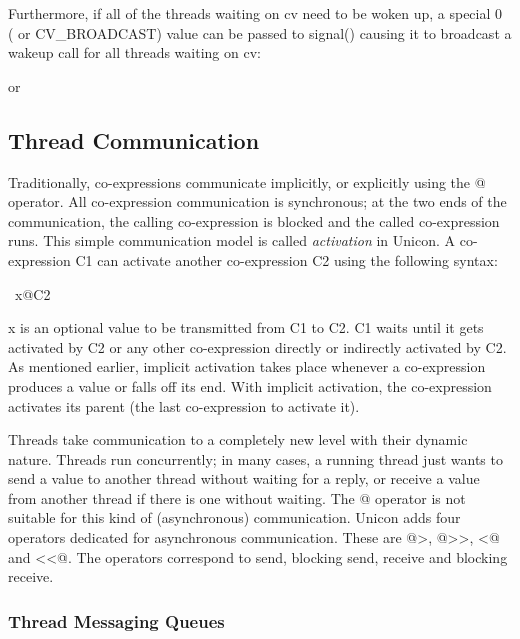 
Furthermore, if all of the threads waiting on
\textsf{cv} need to be woken up, a special
\textsf{0} ( or \textsf{CV\_BROADCAST})
value can be passed to \textsf{signal()} causing it to
broadcast a wakeup call for all threads waiting on
\textsf{cv}:


or



\subsection{Thread Communication}


Traditionally, co-expressions communicate implicitly, or explicitly
using the \textsf{@} operator. All co-expression
communication is synchronous; at the two ends of the communication, the
calling co-expression is blocked and the called co-expression runs.
This simple communication model is called \textit{activation} in
Unicon. A co-expression \textsf{C1} can activate another
co-expression \textsf{C2} using the following syntax:

\ x@C2

\textsf{x} is an optional value to be transmitted from
\textsf{C1} to \textsf{C2}.
\textsf{C1} waits until it gets activated by
\textsf{C2} or any other co-expression directly or
indirectly activated by \textsf{C2}. As mentioned earlier,
implicit activation takes place whenever a co-expression produces a
value or falls off its end. With implicit activation, the co-expression
activates its parent (the last co-expression to activate it).

Threads take communication to a completely new level with their dynamic
nature. Threads run concurrently; in many cases, a running thread just
wants to send a value to another thread without waiting for a reply, or
receive a value from another thread if there is one without waiting.
The \textsf{@} operator is not suitable for this kind of
(asynchronous) communication. Unicon adds four operators dedicated for
asynchronous communication. These are
\textsf{@{\textgreater}},
\textsf{@{\textgreater}{\textgreater}},
\textsf{{\textless}@} and
\textsf{{\textless}{\textless}@}. The operators correspond
to send, blocking send, receive and blocking receive.

\subsubsection{Thread Messaging Queues}

